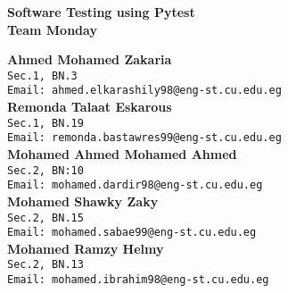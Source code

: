 \documentclass[a4paper,12pt]{article}
\begin{document}
\begin{center}
{ \huge \bfseries Software Testing using Pytest}\\[0.5cm] %
{ \Large \bfseries Team Monday}\\[0.5cm]



\begin{minipage}{0.8\textwidth}
\begin{center} 

\textbf{Ahmed Mohamed Zakaria} \\
\texttt{Sec.1, BN.3} \\
\texttt{Email: ahmed.elkarashily98@eng-st.cu.edu.eg} \\[0.3cm]

\textbf{Remonda Talaat Eskarous} \\
\texttt{Sec.1, BN.19} \\
\texttt{Email: remonda.bastawres99@eng-st.cu.edu.eg} \\[0.3cm]

\textbf{Mohamed Ahmed Mohamed Ahmed} \\
\texttt{Sec.2, BN:10} \\
\texttt{Email: mohamed.dardir98@eng-st.cu.edu.eg} \\[0.3cm]

\textbf{Mohamed Shawky Zaky} \\
\texttt{Sec.2, BN.15} \\
\texttt{Email: mohamed.sabae99@eng-st.cu.edu.eg} \\[0.3cm]

\textbf{Mohamed Ramzy Helmy} \\
\texttt{Sec.2, BN.13} \\
\texttt{Email: mohamed.ibrahim98@eng-st.cu.edu.eg} \\[0.3cm]

\end{center}
\end{minipage}\\[1cm]

\end{center}
\end{document}
